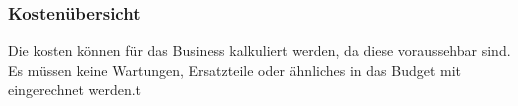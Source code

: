 \subsubsection{Kostenübersicht}
Die kosten können für das Business kalkuliert werden, da diese voraussehbar sind.
Es müssen keine Wartungen, Ersatzteile oder ähnliches in das Budget mit eingerechnet werden.t



